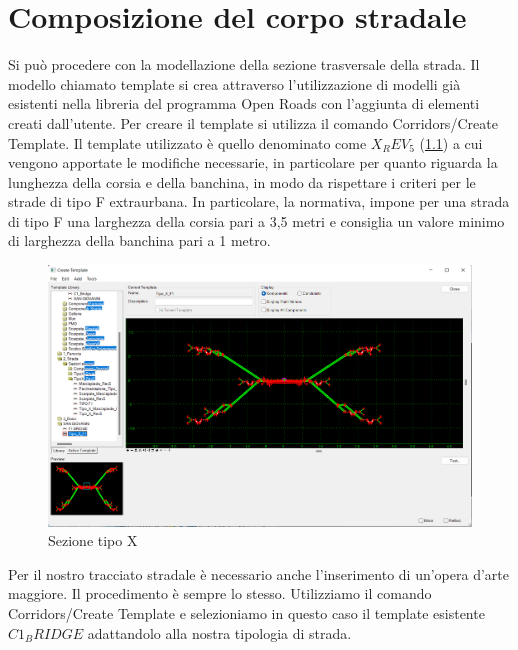 \chapter{Composizione del corpo stradale}

Si può procedere con la modellazione della sezione trasversale della strada. Il modello chiamato template si crea attraverso l'utilizzazione di modelli già esistenti nella libreria del programma Open Roads con l'aggiunta di elementi creati dall'utente. Per creare il template si utilizza il comando Corridors/Create Template. Il template utilizzato è quello denominato come $X_REV_5$ (\ref{Sezione tipo X}) a cui vengono apportate le modifiche necessarie, in particolare per quanto riguarda la lunghezza della corsia e della banchina, in modo da rispettare i criteri per le strade di tipo F extraurbana.
In particolare, la normativa, impone per una strada di tipo F una larghezza della corsia pari a 3,5 metri e consiglia un valore minimo di larghezza della banchina pari a 1 metro.

\begin{figure}[H]
    \includegraphics[width=\textwidth]{Figures/Sezione tipo X.png}
      \caption{Sezione tipo X}
      \label{Sezione tipo X}
\end{figure}

Per il nostro tracciato stradale è necessario anche l'inserimento di un'opera d'arte maggiore. Il procedimento è sempre lo stesso. Utilizziamo il comando Corridors/Create Template e selezioniamo in questo caso il template esistente $C1_BRIDGE$ adattandolo alla nostra tipologia di strada.

